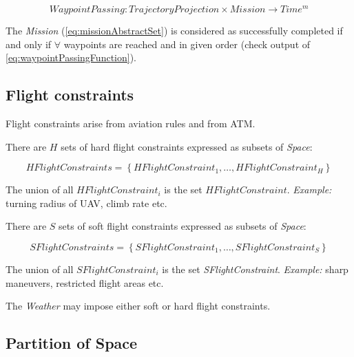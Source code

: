     \begin{equation}\label{eq:waypointPassingFunction}
        WaypointPassing:TrajectoryProjection \times Mission \to Time^m
    \end{equation}

    \begin{note}
        The \emph{Mission} (\ref{eq:missionAbstractSet}) is considered as successfully completed if and only if $\forall$ waypoints are reached and in given order (check output of \ref{eq:waypointPassingFunction}).
    \end{note}



\subsection{Flight constraints}\label{s:FlightConstraints}

    \noindent Flight constraints arise from aviation rules and from ATM. 

    There are $H$ sets of hard flight constraints expressed as subsets of \emph{Space}:

    \begin{equation}\label{eq:HFlightConstraints}
        HFlightConstraints=\left\{HFlightConstraint_1, \dots, HFlightConstraint_H \right\}
    \end{equation}

    The union of all \emph{$HFlightConstraint_i$} is the set \emph{$HFlightConstraint$}. \emph{Example:} turning radius of UAV, climb rate etc. 
    
    There are $S$ sets of soft flight constraints expressed as subsets of \emph{Space}:

    \begin{equation}\label{eq:SFlightConstraints}
        SFlightConstraints=\left\{SFlightConstraint_1, \dots, SFlightConstraint_S \right\}
    \end{equation}

    The union of all \emph{$SFlightConstraint_i$} is the set \emph{SFlightConstraint}. \emph{Example:} sharp maneuvers, restricted flight areas etc.

    The \emph{Weather} may impose either soft or hard flight constraints.



\subsection{Partition of Space}\label{s:partitionOfSpace}

